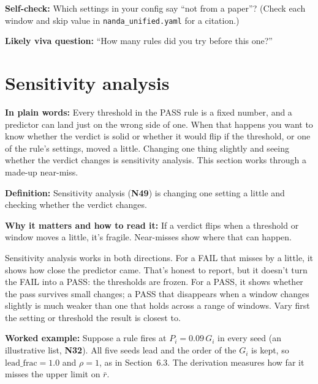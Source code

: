 \documentclass[11pt,a4paper,oneside,openany]{report}
\newcommand{\leadfrac}{\mathrm{lead\_frac}}
\newcommand{\rbar}{\bar{r}}
\newcommand{\code}[1]{\texttt{#1}}
\newcommand{\gl}[1]{\textbf{#1}}   %
\newcommand{\fplain}{\textbf{In plain words:} }
\newcommand{\fdef}{\textbf{Definition:} }
\newcommand{\fread}{\par\textbf{Why it matters and how to read it:} }
\newcommand{\fex}{\par\textbf{Worked example:} }
\newcommand{\fself}{\par\textbf{Self-check:} }
\newcommand{\fviva}{\par\textbf{Likely viva question:} }
\begin{document}
\fself Which settings in your config say ``not from a paper''? (Check each window and skip value in \code{nanda\_\allowbreak{}unified.yaml} for a citation.)
\fviva ``How many rules did you try before this one?''

\section{Sensitivity analysis}
\fplain Every threshold in the PASS rule is a fixed number, and a predictor can land just on the wrong side of one. When that happens you want to know whether the verdict is solid or whether it would flip if the threshold, or one of the rule's settings, moved a little. Changing one thing slightly and seeing whether the verdict changes is sensitivity analysis. This section works through a made-up near-miss.

\fdef Sensitivity analysis (\gl{N49}) is changing one setting a little and checking whether the verdict changes.
\fread If a verdict flips when a threshold or window moves a little, it's fragile. Near-misses show where that can happen.

Sensitivity analysis works in both directions. For a FAIL that misses by a little, it shows how close the predictor came. That's honest to report, but it doesn't turn the FAIL into a PASS: the thresholds are frozen. For a PASS, it shows whether the pass survives small changes; a PASS that disappears when a window changes slightly is much weaker than one that holds across a range of windows. Vary first the setting or threshold the result is closest to.

\fex Suppose a rule fires at $P_i = 0.09\,G_i$ in every seed (an illustrative list, \gl{N32}). All five seeds lead and the order of the $G_i$ is kept, so $\leadfrac = 1.0$ and $\rho = 1$, as in Section~6.3. The derivation measures how far it misses the upper limit on $\rbar$.
\end{document}
